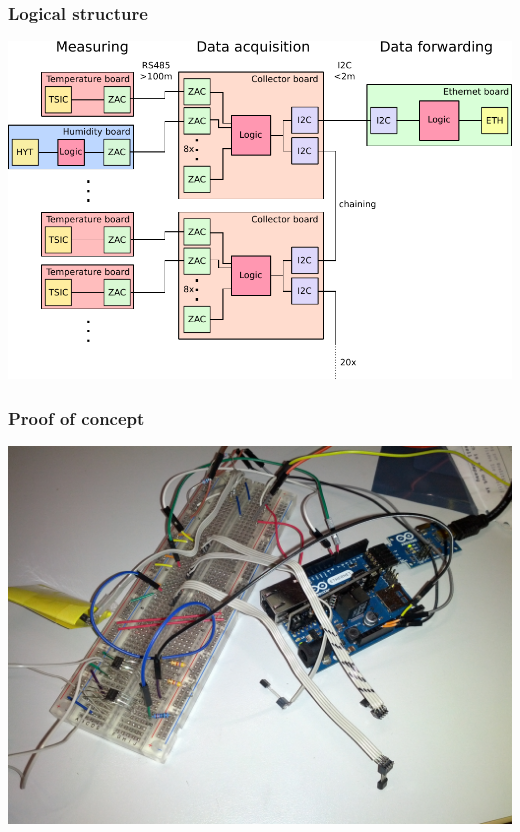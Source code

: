 \documentclass[t]{beamer}
\begin{document}
\begin{frame}[c]
    \frametitle{Logical structure}
  \begin{center}
  	\includegraphics[width=0.9\linewidth]{img/plan2_color.pdf}\\
  \vspace{0.5cm}
  \end{center}
    
\end{frame}
\begin{frame}[c]
    \frametitle{Proof of concept}
  \begin{center}
  	\includegraphics[width=0.8\linewidth]{img/pic/IMG_20140410_213954.jpg}\\
  \vspace{0.5cm}
  \end{center}
\end{frame}
\end{document}
